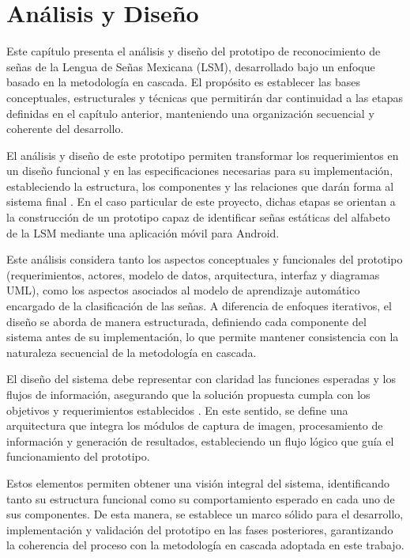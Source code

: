 	\section{Análisis y Diseño}
	
	Este capítulo presenta el análisis y diseño del prototipo de reconocimiento de señas de la Lengua de Señas Mexicana (LSM), desarrollado bajo un enfoque basado en la metodología en cascada. El propósito es establecer las bases conceptuales, estructurales y técnicas que permitirán dar continuidad a las etapas definidas en el capítulo anterior, manteniendo una organización secuencial y coherente del desarrollo.
	
	El análisis y diseño de este prototipo permiten transformar los requerimientos en un diseño funcional y en las especificaciones necesarias para su implementación, estableciendo la estructura, los componentes y las relaciones que darán forma al sistema final \cite{shelly2015}. En el caso particular de este proyecto, dichas etapas se orientan a la construcción de un prototipo capaz de identificar señas estáticas del alfabeto de la LSM mediante una aplicación móvil para Android.
	
	Este análisis considera tanto los aspectos conceptuales y funcionales del prototipo (requerimientos, actores, modelo de datos, arquitectura, interfaz y diagramas UML), como los aspectos asociados al modelo de aprendizaje automático encargado de la clasificación de las señas. A diferencia de enfoques iterativos, el diseño se aborda de manera estructurada, definiendo cada componente del sistema antes de su implementación, lo que permite mantener consistencia con la naturaleza secuencial de la metodología en cascada.
	
	El diseño del sistema debe representar con claridad las funciones esperadas y los flujos de información, asegurando que la solución propuesta cumpla con los objetivos y requerimientos establecidos \cite{kendall2014}. En este sentido, se define una arquitectura que integra los módulos de captura de imagen, procesamiento de información y generación de resultados, estableciendo un flujo lógico que guía el funcionamiento del prototipo.
	
	Estos elementos permiten obtener una visión integral del sistema, identificando tanto su estructura funcional como su comportamiento esperado en cada uno de sus componentes. De esta manera, se establece un marco sólido para el desarrollo, implementación y validación del prototipo en las fases posteriores, garantizando la coherencia del proceso con la metodología en cascada adoptada en este trabajo.
	
